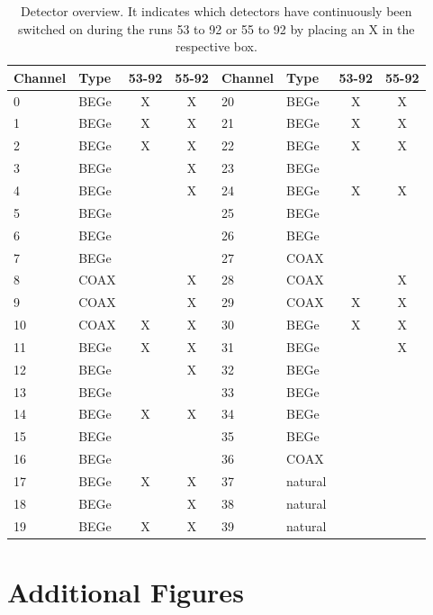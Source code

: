 \begin{table}
    \centering
	\begin{tabular}{|l|l|c|c||l|l|c|c|}
		\hline
		Channel & Type & 53-92 & 55-92 & Channel & Type & 53-92 & 55-92 \\
		\hline
		0 & BEGe & X & X & 20 & BEGe & X & X \\
		\hline
		1 & BEGe & X & X & 21 & BEGe & X & X \\
		\hline
		2 & BEGe & X & X & 22 & BEGe & X & X \\
		\hline
		3 & BEGe &  & X & 23 & BEGe &  &  \\
		\hline
		4 & BEGe &  & X & 24 & BEGe & X & X \\
		\hline
		5 & BEGe &  &  & 25 & BEGe &  &  \\
		\hline
		6 & BEGe &  &  & 26 & BEGe &  &  \\
		\hline
		7 & BEGe &  &  & 27 & COAX &  &  \\
		\hline
		8 & COAX &  & X & 28 & COAX &  & X \\
		\hline
		9 & COAX &  & X & 29 & COAX & X & X \\
		\hline
		10 & COAX & X & X & 30 & BEGe & X & X \\
		\hline
		11 & BEGe & X & X & 31 & BEGe &  & X \\
		\hline
		12 & BEGe &  & X & 32 & BEGe &  &  \\
		\hline
		13 & BEGe &  &  & 33 & BEGe &  &  \\
		\hline
		14 & BEGe & X & X & 34 & BEGe & &  \\
		\hline
		15 & BEGe &  &  & 35 & BEGe &  &  \\
		\hline
		16 & BEGe &  &  & 36 & COAX &  &  \\
		\hline
		17 & BEGe & X & X & 37 & natural &  &  \\
		\hline
		18 & BEGe &  & X & 38 & natural &  &  \\
		\hline
		19 & BEGe & X & X & 39 & natural &  &  \\
		\hline
	\end{tabular}
	\caption{Detector overview. It indicates which detectors have continuously been switched on during the runs 53 to 92 or 55 to 92 by placing an X in the respective box.}
	\label{tab:Detector}
\end{table}
\iffalse
\chapter{Additional Figures}
\label{sec:ResDetermination}


